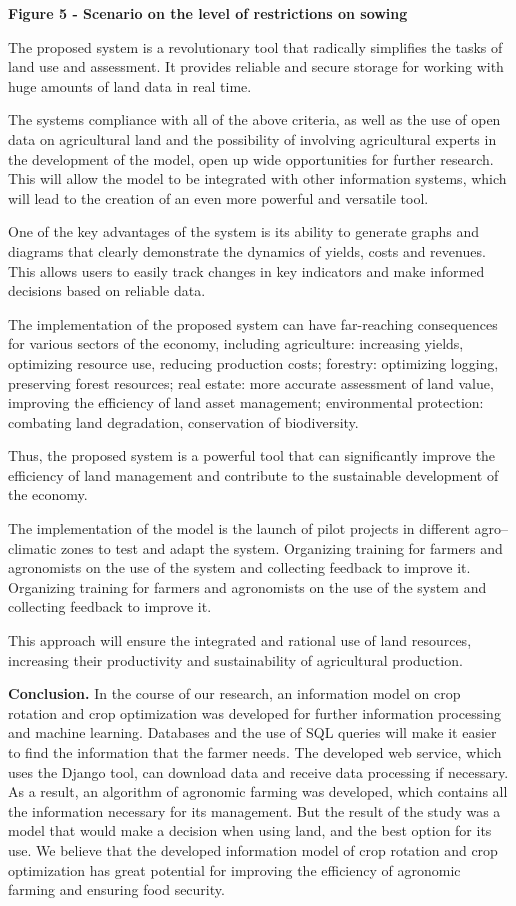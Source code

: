 \textbf{Figure 5 - Scenario on the level of restrictions on sowing}

The proposed system is a revolutionary tool that radically simplifies
the tasks of land use and assessment. It provides reliable and secure
storage for working with huge amounts of land data in real time.

The system\textquotesingle s compliance with all of the above criteria,
as well as the use of open data on agricultural land and the possibility
of involving agricultural experts in the development of the model, open
up wide opportunities for further research. This will allow the model to
be integrated with other information systems, which will lead to the
creation of an even more powerful and versatile tool.

One of the key advantages of the system is its ability to generate
graphs and diagrams that clearly demonstrate the dynamics of yields,
costs and revenues. This allows users to easily track changes in key
indicators and make informed decisions based on reliable data.

The implementation of the proposed system can have far-reaching
consequences for various sectors of the economy, including agriculture:
increasing yields, optimizing resource use, reducing production costs;
forestry: optimizing logging, preserving forest resources; real estate:
more accurate assessment of land value, improving the efficiency of land
asset management; environmental protection: combating land degradation,
conservation of biodiversity.

Thus, the proposed system is a powerful tool that can significantly
improve the efficiency of land management and contribute to the
sustainable development of the economy.

The implementation of the model is the launch of pilot projects in
different agro--climatic zones to test and adapt the system. Organizing
training for farmers and agronomists on the use of the system and
collecting feedback to improve it. Organizing training for farmers and
agronomists on the use of the system and collecting feedback to improve
it.

This approach will ensure the integrated and rational use of land
resources, increasing their productivity and sustainability of
agricultural production.

\textbf{Conclusion.} In the course of our research, an information model
on crop rotation and crop optimization was developed for further
information processing and machine learning. Databases and the use of
SQL queries will make it easier to find the information that the farmer
needs. The developed web service, which uses the Django tool, can
download data and receive data processing if necessary. As a result, an
algorithm of agronomic farming was developed, which contains all the
information necessary for its management. But the result of the study
was a model that would make a decision when using land, and the best
option for its use. We believe that the developed information model of
crop rotation and crop optimization has great potential for improving
the efficiency of agronomic farming and ensuring food security.

